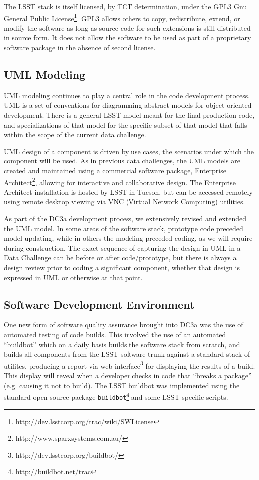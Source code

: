 The LSST stack is itself licensed, by TCT determination, under the GPL3 Gnu
General Public License\footnote{http://dev.lsstcorp.org/trac/wiki/SWLicense}.
GPL3 allows others to copy, redistribute, extend, or modify the software as long
as source code for such extensions is still distributed in source form. It does
not allow the software to be used as part of a proprietary software
package in the absence of second license.   


\subsection{UML Modeling}

UML modeling continues to play a central role in the code development process.
UML is a set of conventions for diagramming abstract models
for object-oriented development. There is a general LSST model meant for the
final production code, and specializations of that model for the specific subset
of that model that falls within the scope of the current data challenge. 

UML design of a component is driven by use cases, the scenarios under which the 
component will be used. As in previous data challenges, the UML models are 
created and maintained using a commercial software package, Enterprise 
Architect\footnote{http://www.sparxsystems.com.au/}, allowing for interactive
and collaborative design. The Enterprise Architect installation is hosted
by LSST in Tucson, but can be accessed remotely using remote desktop viewing
via VNC (Virtual Network Computing) utilities. 

As part of the DC3a development process, we extensively revised and
extended the UML model.   In some areas of the software stack, prototype
code preceded model updating, while in others the modeling preceded
coding, as we will require during construction.  The exact sequence of
capturing the design in UML in a Data Challenge can be before or after
code/prototype, but there is always a design review prior to coding a
significant component, whether that design is expressed in UML or
otherwise at that point. 

\subsection{Software Development Environment}

One new form of software quality assurance brought into DC3a was the use
of automated testing of code builds. This involved the use of an 
automated ``buildbot'' which on a daily basis builds the software stack 
from scratch, and builds all components from the LSST software trunk against
a standard stack of utilites, producing a report via web 
interface\footnote{http://dev.lsstcorp.org/buildbot/} for displaying the
results of a build.  This display will reveal when a developer checks
in code that ``breaks a package'' (e.g. causing it not to build).  The
LSST buildbot was implemented using the standard open source package
\texttt{buildbot}\footnote{http://buildbot.net/trac} and some
LSST-specific scripts. 

